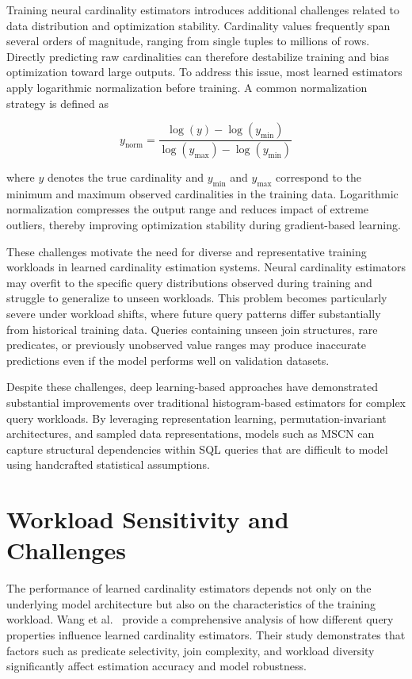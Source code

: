 Training neural cardinality estimators introduces additional challenges related to data distribution and optimization stability. Cardinality values frequently span several orders of magnitude, ranging from single tuples to millions of rows. Directly predicting raw cardinalities can therefore destabilize training and bias optimization toward large outputs. To address this issue, most learned estimators apply logarithmic normalization before training. A common normalization strategy is defined as

\begin{equation}
y_{\text{norm}} =
\frac{
\log(y) - \log(y_{\min})
}{
\log(y_{\max}) - \log(y_{\min})
}
\end{equation}

where $y$ denotes the true cardinality and $y_{\min}$ and $y_{\max}$ correspond to the minimum and maximum observed cardinalities in the training data. Logarithmic normalization compresses the output range and reduces impact of extreme outliers, thereby improving optimization stability during gradient-based learning.

These challenges motivate the need for diverse and representative training workloads in learned cardinality estimation systems. Neural cardinality estimators may overfit to the specific query distributions observed during training and struggle to generalize to unseen workloads. This problem becomes particularly severe under workload shifts, where future query patterns differ substantially from historical training data. Queries containing unseen join structures, rare predicates, or previously unobserved value ranges may produce inaccurate predictions even if the model performs well on validation datasets. 

Despite these challenges, deep learning-based approaches have demonstrated substantial improvements over traditional histogram-based estimators for complex query workloads. By leveraging representation learning, permutation-invariant architectures, and sampled data representations, models such as MSCN can capture structural dependencies within SQL queries that are difficult to model using handcrafted statistical assumptions.

\section{Workload Sensitivity and Challenges}

The performance of learned cardinality estimators depends not only on the underlying model architecture but also on the characteristics of the training workload. Wang et al.~\cite{DBLP:journals/pvldb/WangQWWZ21} provide a comprehensive analysis of how different query properties influence learned cardinality estimators. Their study demonstrates that factors such as predicate selectivity, join complexity, and workload diversity significantly affect estimation accuracy and model robustness.

